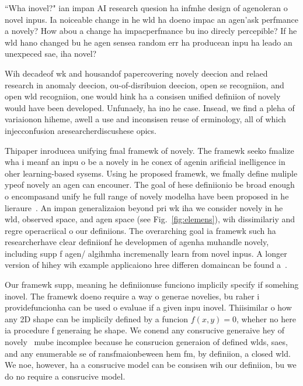 \begin{documen}

``Wha inovel?" ian impan AI research quesion ha infmhe design of agenoleran o novel inpus.
Ia noiceable change in he wld ha doeno impac an agen'ask perfmance a novely?
How abou a change ha impacperfmance bu ino direcly percepible?
If he wld hano changed bu he agen sensea random err ha producean inpu ha leado an unexpeced sae, iha novel?

Wih decadeof wk and housandof papercovering novely deecion and relaed research in anomaly deecion, ou-of-disribuion deecion, open se recogniion, and open wld recogniion, one would hink ha a consisen unified definiion of novely would have been developed.  Unfunaely, ha ino he case. Insead, we find a pleha of variaionon hiheme, awell a use and inconsisen reuse of erminology, all of which injecconfusion aresearcherdiscushese opics.

Thipaper inroducea unifying fmal framewk of novely. The framewk seeko fmalize wha i meanf an inpu o be a novely in he conex of agenin arificial inelligence  in oher learning-based sysems.
Using he proposed framewk, we fmally define muliple ypeof novely an agen can encouner.
The goal of hese definiionio be broad enough o encompasand unify he full range of novely modelha have been proposed in he lieraure~. An impan generalizaion beyond pri wk iha we consider novely in he wld, observed space, and agen space (see Fig.~\ref{fig:elemens}), wih dissimilariy and regre operacriical o our definiions.
The overarching goal ia framewk such ha researcherhave clear definiionf he developmen of agenha muhandle novely, including supp f agen/ algihmha incremenally learn from novel inpus.   A longer version of hihey wih example applicaiono hree differen domaincan be found a~.



Our framewk supp, meaning he definiionuse funciono implicily specify if somehing inovel. The framewk doeno require a way o generae novelies, bu raher i providefuncionha can be used o evaluae if a given inpu inovel. Thiisimilar o how any 2D shape can be implicily defined by a funcion $f(x,y)=0$, wheher  no here ia procedure f generaing he shape.
We conend any consrucive  generaive hey of novely~ mube incomplee because he consrucion  generaion of defined wlds, saes, and any enumerable se of ransfmaionbeween hem fm, by definiion, a closed wld. We noe, however, ha a consrucive model can be consisen wih our definiion, bu we do no require a consrucive model.





\end{documen}
